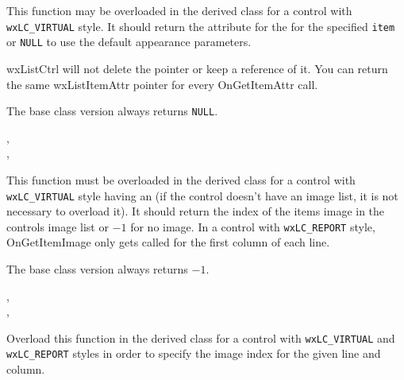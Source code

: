 
This function may be overloaded in the derived class for a control with
{\tt wxLC\_VIRTUAL} style. It should return the attribute for the
for the specified {\tt item} or {\tt NULL} to use the default appearance
parameters.

wxListCtrl will not delete the pointer or keep a reference of it. You can 
return the same wxListItemAttr pointer for every OnGetItemAttr call.

The base class version always returns {\tt NULL}.


,\\
,\\


\label{wxlistctrlongetitemimage}


This function must be overloaded in the derived class for a control with
{\tt wxLC\_VIRTUAL} style having an 
(if the control doesn't have an image list, it is not necessary to overload
 it). It should return the index of the items image in the controls image list
or $-1$ for no image.
In a control with {\tt wxLC\_REPORT} style, OnGetItemImage only gets called for
the first column of each line.

The base class version always returns $-1$.


,\\
,\\

\label{wxlistctrlongetitemcolumnimage}


Overload this function in the derived class for a control with
{\tt wxLC\_VIRTUAL} and {\tt wxLC\_REPORT} styles in order to specify the image
index for the given line and column.

